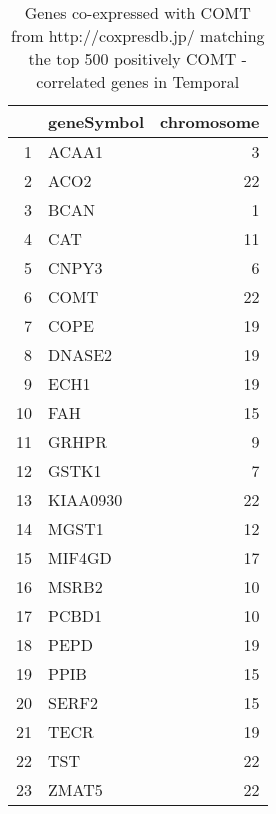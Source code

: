 \documentclass[letterpaper,12pt]{article}
\numberwithin{equation}{appendix}
\begin{document}
{{\clearpage
\begin{table}[ht]
\centering
\begin{tabular}{rlr}
  \hline
 & geneSymbol & chromosome \\ 
  \hline
1 & ACAA1 &   3 \\ 
  2 & ACO2 &  22 \\ 
  3 & BCAN &   1 \\ 
  4 & CAT &  11 \\ 
  5 & CNPY3 &   6 \\ 
  6 & COMT &  22 \\ 
  7 & COPE &  19 \\ 
  8 & DNASE2 &  19 \\ 
  9 & ECH1 &  19 \\ 
  10 & FAH &  15 \\ 
  11 & GRHPR &   9 \\ 
  12 & GSTK1 &   7 \\ 
  13 & KIAA0930 &  22 \\ 
  14 & MGST1 &  12 \\ 
  15 & MIF4GD &  17 \\ 
  16 & MSRB2 &  10 \\ 
  17 & PCBD1 &  10 \\ 
  18 & PEPD &  19 \\ 
  19 & PPIB &  15 \\ 
  20 & SERF2 &  15 \\ 
  21 & TECR &  19 \\ 
  22 & TST &  22 \\ 
  23 & ZMAT5 &  22 \\ 
   \hline
\end{tabular}
\caption{Genes co-expressed with COMT from http://coxpresdb.jp/ matching the top 500 positively COMT - correlated genes in Temporal} 
\end{table}

}}
\end{document}
